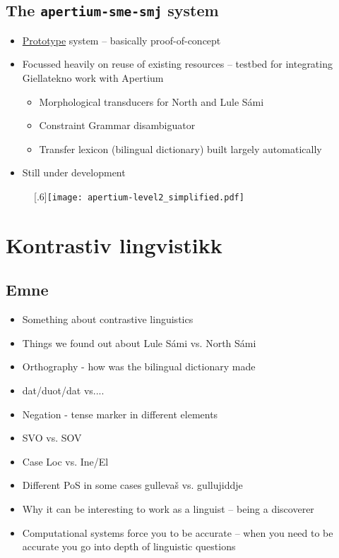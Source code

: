 \documentclass[a4paper,english,12pt]{article}
\begin{document}
\begin{spacing}{1.0}
 


 
\subsection{The {\tt apertium-sme-smj} system}

\begin{itemize}
  \item \underline{Prototype} system -- basically proof-of-concept
  \item Focussed heavily on reuse of existing resources -- testbed for 
    integrating Giellatekno work with Apertium
  \begin{itemize}
    \item Morphological transducers for North and Lule Sámi
    \item Constraint Grammar disambiguator
    \item Transfer lexicon (bilingual dictionary) built largely automatically
  \end{itemize}
  \item Still under development
\end{itemize}

 
\begin{figure}
\scalebox{.6}[.6]{\texttt{[image: apertium-level2\_simplified.pdf]}}
 \end{figure}


\section{Kontrastiv lingvistikk} 
\subsection{Emne}
\begin{itemize}
\item Something about contrastive linguistics  
\item Things we found out about Lule Sámi vs. North Sámi  
\item Orthography - how was the bilingual dictionary made  
\item dat/duot/dat vs.... 
\item Negation - tense marker in different elements  
\item SVO vs. SOV  
\item Case Loc vs. Ine/El  
\item Different PoS in some cases gullevaš vs. gullujiddje  
\item Why it can be interesting to work as a linguist -- being a discoverer  
\item Computational systems force you to be accurate -- when you need to be accurate you go into depth of linguistic questions
\end{itemize} 


\end{spacing}
\end{document}
